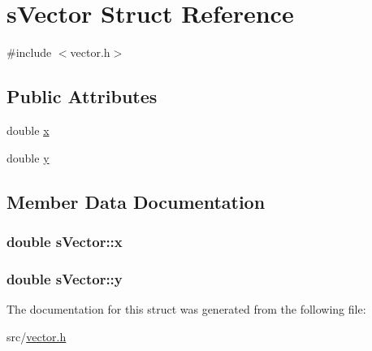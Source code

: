 \hypertarget{structs_vector}{}\section{s\+Vector Struct Reference}
\label{structs_vector}


{\ttfamily \#include $<$vector.\+h$>$}

\subsection*{Public Attributes}
\begin{DoxyCompactItemize}
\item 
double \hyperlink{structs_vector_a4e62b33435b0449e7b48345566c0df39}{x}
\item 
double \hyperlink{structs_vector_a55394596f14d12a5b46082a1ed5fa653}{y}
\end{DoxyCompactItemize}


\subsection{Member Data Documentation}
\hypertarget{structs_vector_a4e62b33435b0449e7b48345566c0df39}{}
\subsubsection[{x}]{\setlength{\rightskip}{0pt plus 5cm}double s\+Vector\+::x}\label{structs_vector_a4e62b33435b0449e7b48345566c0df39}
\hypertarget{structs_vector_a55394596f14d12a5b46082a1ed5fa653}{}
\subsubsection[{y}]{\setlength{\rightskip}{0pt plus 5cm}double s\+Vector\+::y}\label{structs_vector_a55394596f14d12a5b46082a1ed5fa653}


The documentation for this struct was generated from the following file\+:\begin{DoxyCompactItemize}
\item 
src/\hyperlink{vector_8h}{vector.\+h}\end{DoxyCompactItemize}
